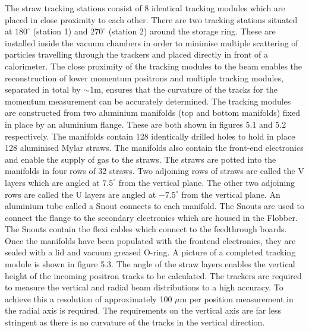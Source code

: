 The straw tracking stations consist of 8 identical tracking modules which are placed in close proximity to each other. There are two tracking stations situated at $180^{\circ}$ (station 1) and $270^{\circ}$ (station 2) around the storage ring. These are installed inside the vacuum chambers in order to minimise multiple scattering of particles travelling through the trackers and placed directly in front of a calorimeter. The close proximity of the tracking modules to the beam enables the reconstruction of lower momentum positrons and multiple tracking modules, separated in total by $\sim$1m, ensures that the curvature of the tracks for the momentum measurement can be accurately determined. The tracking modules are constructed from two aluminium manifolds (top and bottom manifolds) fixed in place by an aluminium flange. These are both shown in figures 5.1 and 5.2 respectively. The manifolds contain 128 identically drilled holes to hold in place 128 aluminised Mylar straws. The manifolds also contain the front-end electronics and enable the supply of gas to the straws. The straws are potted into the manifolds in four rows of 32 straws. Two adjoining rows of straws are called the V layers which are angled at $7.5^{\circ}$ from the vertical plane. The other two adjoining rows are called the U layers are angled at $-7.5^{\circ}$ from the vertical plane. An aluminium tube called a Snout connects to each manifold. The Snouts are used to connect the flange to the secondary electronics which are housed in the Flobber. The Snouts contain the flexi cables which connect to the feedthrough boards. Once the manifolds have been populated with the frontend electronics, they are sealed with a lid and vacuum greased O-ring. A picture of a completed tracking module is shown in figure 5.3. The angle of the straw layers enables the vertical height of the incoming positron tracks to be calculated. The trackers are required to measure the vertical and radial beam distributions to a high accuracy. To achieve this a resolution of approximately 100 $\mu$m per position measurement in the radial axis is required. The requirements on the vertical axis are far less stringent as there is no curvature of the tracks in the vertical direction. 

